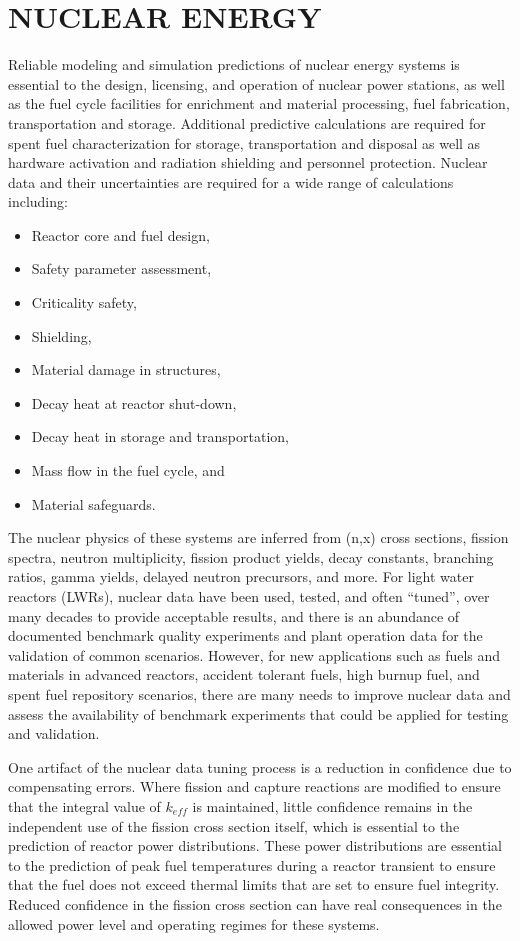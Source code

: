 \documentclass[letterpaper]{ar-1col}
\begin{document}
\section{NUCLEAR ENERGY}

Reliable modeling and simulation predictions of nuclear energy systems is essential to the design, licensing, and operation of nuclear power stations, as well as the fuel cycle facilities for enrichment and material processing, fuel fabrication, transportation and storage. Additional predictive calculations are required for spent fuel characterization for storage, transportation and disposal as well as hardware activation and radiation shielding and personnel protection. Nuclear data and their uncertainties are required for a wide range of calculations including:
\begin{itemize}
  \item Reactor core and fuel design,
  \item Safety parameter assessment,
  \item Criticality safety,
  \item Shielding,
  \item Material damage in structures,
  \item Decay heat at reactor shut-down,
  \item Decay heat in storage and transportation,
  \item Mass flow in the fuel cycle, and
  \item Material safeguards.
\end{itemize}

The nuclear physics of these systems are inferred from (n,x) cross sections, fission spectra, neutron multiplicity, fission product yields, decay constants, branching ratios, gamma yields, delayed neutron precursors, and more.  For light water reactors (LWRs), nuclear data have been used, tested, and often \enquote{tuned}, over many decades to provide acceptable results, and there is an abundance of documented benchmark quality experiments and plant operation data for the validation of common scenarios. However, for new applications such as fuels and materials in advanced reactors, accident tolerant fuels, high burnup fuel, and spent fuel repository scenarios, there are many needs to improve nuclear data and assess the availability of benchmark experiments that could be applied for testing and validation. 

One artifact of the nuclear data tuning process is a reduction in confidence due to compensating errors. Where fission and capture reactions are modified to ensure that the integral value of $k_{eff}$ is maintained, little confidence remains in the independent use of the fission cross section itself, which is essential to the prediction of reactor power distributions. These power distributions are essential to the prediction of peak fuel temperatures during a reactor transient to ensure that the fuel does not exceed thermal limits that are set to ensure fuel integrity. Reduced confidence in the fission cross section can have real consequences in the allowed power level and operating regimes for these systems.
\end{document}
